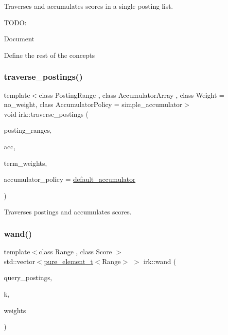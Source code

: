 Traverses and accumulates scores in a single posting list. 

T\+O\+DO\+:
\begin{DoxyItemize}
\item Document
\item Define the rest of the concepts 
\end{DoxyItemize}\mbox{\label{namespaceirk_a8dbdf5c2b9eef7379aae57b72861978a}} 
\subsubsection{\texorpdfstring{traverse\+\_\+postings()}{traverse\_postings()}}
{\footnotesize\ttfamily template$<$class Posting\+Range , class Accumulator\+Array , class Weight  = no\+\_\+weight, class Accumulator\+Policy  = simple\+\_\+accumulator$>$ \\
void irk\+::traverse\+\_\+postings (\begin{DoxyParamCaption}\item[{const std\+::vector$<$ Posting\+Range $>$ \&}]{posting\+\_\+ranges,  }\item[{Accumulator\+Array \&}]{acc,  }\item[{const std\+::vector$<$ \mbox{\hyperlink{namespaceirk_a87bce44d1e3fdff0b1b3bb78f2a5f924}{score\+\_\+t}}$<$ \mbox{\hyperlink{namespaceirk_a1e48b43a3f40d553264380da5e7263c1}{pure\+\_\+element\+\_\+t}}$<$ Posting\+Range $>$$>$$>$ \&}]{term\+\_\+weights,  }\item[{Accumulator\+Policy}]{accumulator\+\_\+policy = {\ttfamily \mbox{\hyperlink{namespaceirk_ab2909e62b829f7926f8d47d3146d9939}{default\+\_\+accumulator}}} }\end{DoxyParamCaption})}



Traverses postings and accumulates scores. 

\mbox{\label{namespaceirk_a8f6987f583ef7a5eff4291ccea6d7170}} 
\subsubsection{\texorpdfstring{wand()}{wand()}}
{\footnotesize\ttfamily template$<$class Range , class Score $>$ \\
std\+::vector$<$\mbox{\hyperlink{namespaceirk_a1e48b43a3f40d553264380da5e7263c1}{pure\+\_\+element\+\_\+t}}$<$Range$>$ $>$ irk\+::wand (\begin{DoxyParamCaption}\item[{const std\+::vector$<$ Range $>$ \&}]{query\+\_\+postings,  }\item[{std\+::size\+\_\+t}]{k,  }\item[{const std\+::vector$<$ Score $>$ \&}]{weights }\end{DoxyParamCaption})}



